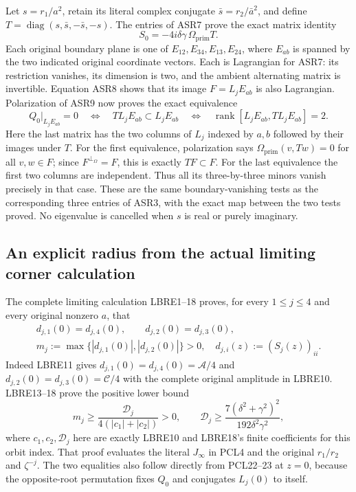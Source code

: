 \documentclass[11pt,a4paper]{article}
\begin{document}
Let $s=r_1/a^2$, retain its literal complex conjugate
$\bar s=r_2/\bar a^2$, and define
$T=\operatorname{diag}(s,\bar s,-\bar s,-s)$.
The entries of ASR7 prove the exact matrix identity
\[
 S_0=-4i\delta\gamma\,\Omega_{\mathrm{prim}}T.
 \tag{ASR9}
\]
Each original boundary plane is one of
$E_{12},E_{34},E_{13},E_{24}$, where $E_{ab}$ is spanned by
the two indicated original coordinate vectors. Each is Lagrangian
for ASR7: its restriction vanishes, its dimension is two, and the
ambient alternating matrix is invertible. Equation ASR8 shows that
its image $F=L_jE_{ab}$ is also Lagrangian. Polarization of ASR9
now proves the exact equivalence
\[
 Q_0|_{L_jE_{ab}}=0
 \quad\Longleftrightarrow\quad
 T L_jE_{ab}\subset L_jE_{ab}
 \quad\Longleftrightarrow\quad
 \operatorname{rank}[L_jE_{ab},TL_jE_{ab}]=2.
 \tag{ASR10}
\]
Here the last matrix has the two columns of $L_j$ indexed by $a,b$
followed by their images under $T$. For the first equivalence,
polarization says $\Omega_{\mathrm{prim}}(v,Tw)=0$ for all $v,w\in F$;
since $F^{\perp_{\Omega}}=F$, this is exactly $TF\subset F$.
For the last equivalence the first two columns are independent.
Thus all its three-by-three minors vanish precisely in that case.
These are the same boundary-vanishing tests as the corresponding
three entries of ASR3, with the exact map between the two tests proved.
No eigenvalue is cancelled when $s$ is real or purely imaginary.

\subsection{An explicit radius from the actual limiting corner calculation}
The complete limiting calculation LBRE1--18 proves, for every
$1\le j\le4$ and every original nonzero $a$, that
\[
\begin{gathered}
 d_{j,1}(0)=d_{j,4}(0),\qquad d_{j,2}(0)=d_{j,3}(0),\\
 m_j:=\max\{|d_{j,1}(0)|,|d_{j,2}(0)|\}>0,
 \quad d_{j,i}(z):=(S_j(z))_{ii}.
\end{gathered}
 \tag{ASR11}
\]
Indeed LBRE11 gives
$d_{j,1}(0)=d_{j,4}(0)=\mathcal A/4$ and
$d_{j,2}(0)=d_{j,3}(0)=\mathcal C/4$ with the complete original
amplitude in LBRE10. LBRE13--18 prove the positive lower bound
\[
 m_j\ge\frac{\mathcal D_j}{4(|c_1|+|c_2|)}>0,
 \qquad \mathcal D_j\ge
       \frac{7(\delta^2+\gamma^2)^2}{192\delta^2\gamma^2},
\]
where $c_1,c_2,\mathcal D_j$ here are exactly LBRE10 and LBRE18's
finite coefficients for this orbit index. That proof evaluates the
literal $J_\infty$ in PCL4 and the original $r_1/r_2$ and
$\zeta^{-j}$. The two equalities also follow directly from
PCL22--23 at $z=0$, because the opposite-root permutation fixes
$Q_0$ and conjugates $L_j(0)$ to itself.
\end{document}
